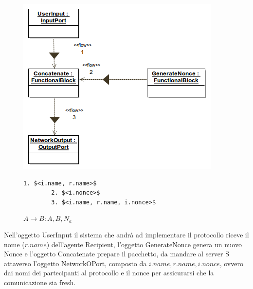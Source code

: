 \begin{figure}[h!] 
    \centering 
    \includegraphics[scale=0.6]{img/NSSK/First_message(toServer)_Object diagram.png} 
    \begin{lstlisting}[frame=single, mathescape, basicstyle=\footnotesize]
        1. $<i.name, r.name>$
        2. $<i.nonce>$
        3. $<i.name, r.name, i.nonce>$
    \end{lstlisting}
    \caption{$A \rightarrow B : A, B, N_a$} 
\end{figure}
\noindent Nell'oggetto UserInput il sistema che andrà ad implementare il protocollo riceve il nome ($r.name$) dell'agente Recipient, l'oggetto GenerateNonce genera un nuovo Nonce e l'oggetto Concatenate prepare il pacchetto, da mandare al server S attaverso l'oggetto NetworkOPort, composto da $i.name, r.name, i.nonce$, ovvero dai nomi dei partecipanti al protocollo e il nonce per assicurarsi che la comunicazione sia fresh.
\newpage
